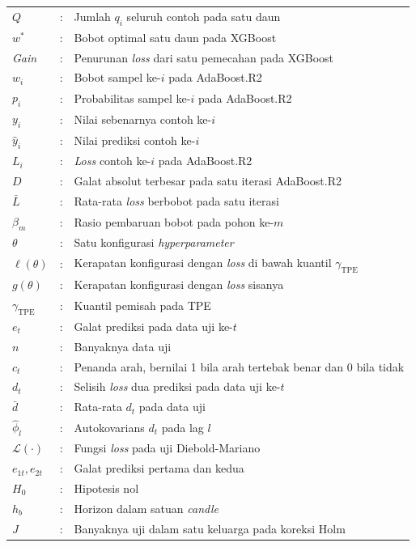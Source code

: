 \begin{longtable}{@{}p{3cm}@{}p{0.6cm}@{}p{\dimexpr\textwidth-3.6cm\relax}@{}}
  $Q$ & : & Jumlah $q_i$ seluruh contoh pada satu daun \\
  $w^{*}$ & : & Bobot optimal satu daun pada XGBoost \\
  \textit{Gain} & : & Penurunan \textit{loss} dari satu pemecahan pada
    XGBoost \\
  $w_i$ & : & Bobot sampel ke-$i$ pada AdaBoost.R2 \\
  $p_i$ & : & Probabilitas sampel ke-$i$ pada AdaBoost.R2 \\
  $y_i$ & : & Nilai sebenarnya contoh ke-$i$ \\
  $\hat{y}_i$ & : & Nilai prediksi contoh ke-$i$ \\
  $L_i$ & : & \textit{Loss} contoh ke-$i$ pada AdaBoost.R2 \\
  $D$ & : & Galat absolut terbesar pada satu iterasi AdaBoost.R2 \\
  $\bar{L}$ & : & Rata-rata \textit{loss} berbobot pada satu iterasi \\
  $\beta_m$ & : & Rasio pembaruan bobot pada pohon ke-$m$ \\
  $\theta$ & : & Satu konfigurasi \textit{hyperparameter} \\
  $\ell(\theta)$ & : & Kerapatan konfigurasi dengan \textit{loss} di bawah
    kuantil $\gamma_{\text{TPE}}$ \\
  $g(\theta)$ & : & Kerapatan konfigurasi dengan \textit{loss} sisanya \\
  $\gamma_{\text{TPE}}$ & : & Kuantil pemisah pada TPE \\
  $e_t$ & : & Galat prediksi pada data uji ke-$t$ \\
  $n$ & : & Banyaknya data uji \\
  $c_t$ & : & Penanda arah, bernilai 1 bila arah tertebak benar dan 0 bila
    tidak \\
  $d_t$ & : & Selisih \textit{loss} dua prediksi pada data uji ke-$t$ \\
  $\bar{d}$ & : & Rata-rata $d_t$ pada data uji \\
  $\hat{\phi}_l$ & : & Autokovarians $d_t$ pada lag $l$ \\
  $\mathcal{L}(\cdot)$ & : & Fungsi \textit{loss} pada uji Diebold-Mariano \\
  $e_{1t}, e_{2t}$ & : & Galat prediksi pertama dan kedua \\
  $H_0$ & : & Hipotesis nol \\
  $h_b$ & : & Horizon dalam satuan \textit{candle} \\
  $J$ & : & Banyaknya uji dalam satu keluarga pada koreksi Holm \\

\end{longtable}
